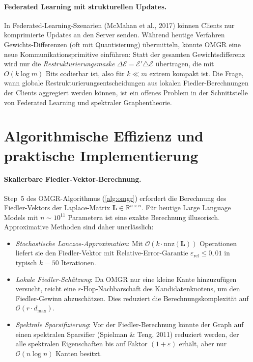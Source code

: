 ﻿\documentclass[12pt, a4paper, openany]{report}
\newcommand{\R}{\mathbb{R}}
\newcommand{\calE}{\mathcal{E}}
\newcommand{\eps}{\varepsilon}
\begin{document}
\paragraph{Federated Learning mit strukturellen Updates.}
In Federated-Learning-Szenarien (McMahan et al., 2017) können Clients
nur komprimierte Updates an den Server senden.  Während heutige Verfahren
Gewichts-Differenzen (oft mit Quantisierung) übermitteln, könnte
OMGR eine neue Kommunikationsprimitive einführen: Statt der gesamten
Gewichtsdifferenz wird nur die \emph{Restrukturierungsmaske}
$\Delta\calE = \calE' \triangle \calE$ übertragen, die mit $O(k \log m)$
Bits codierbar ist, also für $k \ll m$ extrem kompakt ist.
Die Frage, wann globale Restrukturierungsentscheidungen aus lokalen
Fiedler-Berechnungen der Clients aggregiert werden können, ist ein
offenes Problem in der Schnittstelle von Federated Learning und
spektraler Graphentheorie.

\section{Algorithmische Effizienz und praktische Implementierung}
\label{sec:outlook_algo}

\paragraph{Skalierbare Fiedler-Vektor-Berechnung.}
Step~5 des OMGR-Algorithmus (\cref{alg:omgr}) erfordert die Berechnung
des Fiedler-Vektors der Laplace-Matrix $\bm{L} \in \R^{n \times n}$.
Für heutige Large Language Models mit $n \sim 10^{11}$ Parametern ist
eine exakte Berechnung illusorisch.  Approximative Methoden sind
daher unerlässlich:
\begin{itemize}
  \item \emph{Stochastische Lanczos-Approximation}: Mit $\mathcal{O}(k \cdot \mathrm{nnz}(\bm{L}))$
    Operationen liefert sie den Fiedler-Vektor mit Relative-Error-Garantie
    $\eps_{\mathrm{rel}} \leq 0{,}01$ in typisch $k = 50$ Iterationen.
  \item \emph{Lokale Fiedler-Schätzung}: Da OMGR nur eine kleine Kante
    hinzuzufügen versucht, reicht eine $r$-Hop-Nachbarschaft des
    Kandidatenknotens, um den Fiedler-Gewinn abzuschätzen.  Dies reduziert
    die Berechnungskomplexität auf $\mathcal{O}(r \cdot d_{\max})$.
  \item \emph{Spektrale Sparsifizierung}: Vor der Fiedler-Berechnung
    könnte der Graph auf einen spektralen Sparsifier (Spielman \& Teng, 2011)
    reduziert werden, der alle spektralen Eigenschaften bis auf Faktor
    $(1+\eps)$ erhält, aber nur $\mathcal{O}(n \log n)$ Kanten besitzt.
\end{itemize}
\end{document}
